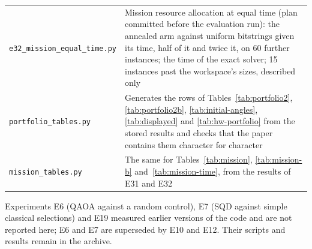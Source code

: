 \documentclass[11pt,a4paper]{article}
\begin{document}
\begin{center}
\begin{tabular}{lp{8.7cm}}
\texttt{e32\_mission\_equal\_time.py} & Mission resource allocation at equal time (plan committed before the evaluation run): the annealed arm against uniform bitstrings given its time, half of it and twice it, on 60 further instances; the time of the exact solver; 15 instances past the workspace's sizes, described only \\
\texttt{portfolio\_tables.py} & Generates the rows of Tables~\ref{tab:portfolio2}, \ref{tab:portfolio2b}, \ref{tab:initial-angles}, \ref{tab:displayed} and \ref{tab:hw-portfolio} from the stored results and checks that the paper contains them character for character \\
\texttt{mission\_tables.py} & The same for Tables~\ref{tab:mission}, \ref{tab:mission-b} and~\ref{tab:mission-time}, from the results of E31 and E32 \\
\bottomrule
\end{tabular}
\end{center}

\noindent Experiments E6 (QAOA against a random control), E7 (SQD against
simple classical selections) and E19 measured earlier versions of the code
and are not reported here; E6 and E7 are superseded by E10 and
E12. Their scripts and results remain in the archive.
\end{document}
